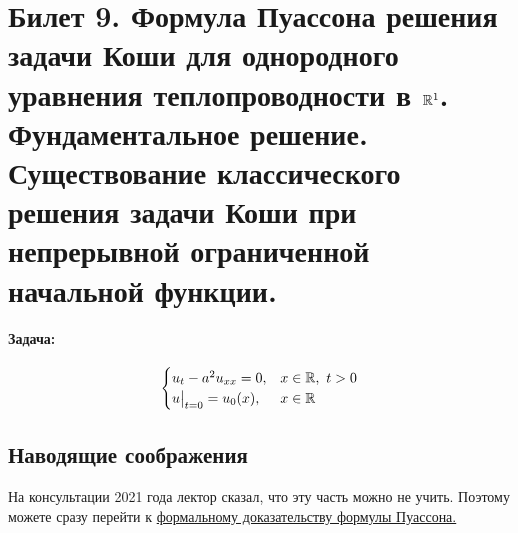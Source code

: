 \documentclass[../main.tex]{subfiles}
\begin{document}
\section{Билет 9. Формула Пуассона решения задачи Коши для однородного уравнения теплопроводности в \texorpdfstring{$\mathbb{R}^1$}{R}. Фундаментальное решение. Существование классического решения задачи Коши при непрерывной ограниченной начальной функции.}

\paragraph{Задача:}
\begin{equation*}
\begin{cases}
	u_t - a^2u_{xx} = 0, &x \in \mathbb{R},\ t > 0 \\
	u\bigr|_{t = 0} = u_0(x), &x \in \mathbb{R}
\end{cases}
\end{equation*}

\subsection{Наводящие соображения}

На консультации 2021 года лектор сказал, что эту часть можно не учить. Поэтому можете сразу перейти к \hyperref[sec:FormalProof]{формальному доказательству формулы Пуассона.}
\vspace{0.7em}
\end{document}
